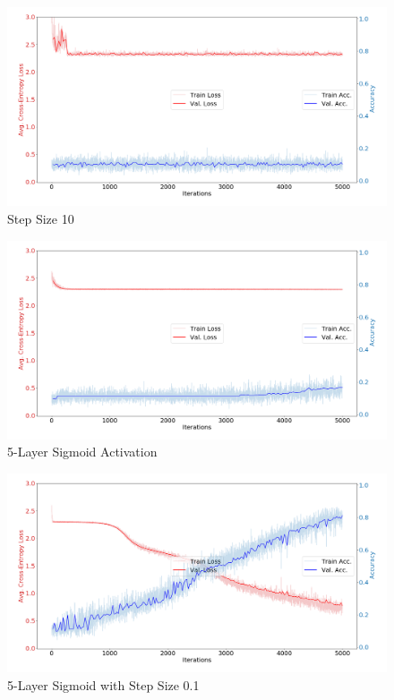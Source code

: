 \documentclass{article}
\begin{document}
        \begin{figure}[b]
            \includegraphics[width=\textwidth]{"SS_10.png"}
            \caption{Step Size 10}
        \end{figure}
        \clearpage
        \begin{figure}[h]
            \includegraphics[width=\textwidth]{"L_5_Sig.png"}
            \caption{5-Layer Sigmoid Activation}
        \end{figure}
        \begin{figure}[h!]
            \includegraphics[width=\textwidth]{"L_5_SS_p1.png"}
            \caption{5-Layer Sigmoid with Step Size 0.1}
        \end{figure}
\end{document}
